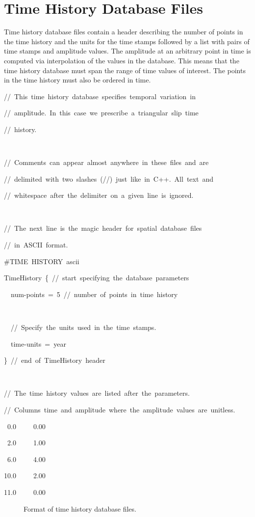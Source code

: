 \section{\label{sec:Spatialdata:TimeHistoryIO}Time History Database Files}

Time history database files contain a header describing the number
of points in the time history and the units for the time stamps followed
by a list with pairs of time stamps and amplitude values. The amplitude
at an arbitrary point in time is computed via interpolation of the
values in the database. This means that the time history database
must span the range of time values of interest. The points in the
time history must also be ordered in time.
\begin{lyxcode}
//~This~time~history~database~specifies~temporal~variation~in

//~amplitude.~In~this~case~we~prescribe~a~triangular~slip~time

//~history.~

~

//~Comments~can~appear~almost~anywhere~in~these~files~and~are

//~delimited~with~two~slashes~(//)~just~like~in~C++.~All~text~and~

//~whitespace~after~the~delimiter~on~a~given~line~is~ignored.

~

//~The~next~line~is~the~magic~header~for~spatial~database~files~

//~in~ASCII~format.

\#TIME~HISTORY~ascii

TimeHistory~\{~//~start~specifying~the~database~parameters

~~num-points~=~5~//~number~of~points~in~time~history

~

~~//~Specify~the~units~used~in~the~time~stamps.

~~time-units~=~year



\}~//~end~of~TimeHistory~header

~

//~The~time~history~values~are~listed~after~the~parameters.

//~Columns~time~and~amplitude~where~the~amplitude~values~are~unitless.

~0.0~~~~~0.00

~2.0~~~~~1.00

~6.0~~~~~4.00

10.0~~~~~2.00

11.0~~~~~0.00
\end{lyxcode}
\begin{figure}[H]
\caption{Format of time history database files.}
\end{figure}



